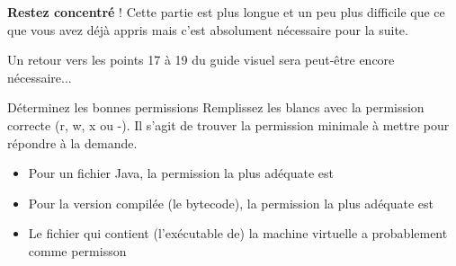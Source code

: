 \documentclass[a4paper,11pt]{article}
\begin{document}
\textbf{Restez concentr\'e} ! 
Cette partie est plus longue et un peu plus difficile que ce que vous avez d\'ej\`a appris 
mais c'est absolument n\'ecessaire pour la suite.   

Un retour vers les points 17 \`a 19 du guide visuel sera peut-\^etre encore n\'ecessaire...  


\begin{Exercice}{D\'eterminez les bonnes permissions}
	Remplissez les blancs avec la permission correcte (r, w, x ou -). 
	Il s'agit de trouver la permission minimale \`a mettre pour r\'epondre \`a la demande.   
	
	\begin{itemize}
		
		\item 
		Pour un fichier Java, la permission la plus ad\'equate est
		\textcolor{gray}{\underline{\hspace*{1em}}}  \textcolor{gray}{\underline{\hspace*{1em}}}  \textcolor{gray}{\underline{\hspace*{1em}}} 
		\item 
		Pour la version compil\'ee (le bytecode), la permission la plus ad\'equate est
		\textcolor{gray}{\underline{\hspace*{1em}}}  \textcolor{gray}{\underline{\hspace*{1em}}}  \textcolor{gray}{\underline{\hspace*{1em}}} 
		\item 
		Le fichier qui contient (l'ex\'ecutable de) la machine virtuelle a probablement comme permisson
		\textcolor{gray}{\underline{\hspace*{1em}}}  \textcolor{gray}{\underline{\hspace*{1em}}}  \textcolor{gray}{\underline{\hspace*{1em}}} 
	\end{itemize}
	
\end{Exercice}
\end{document}
